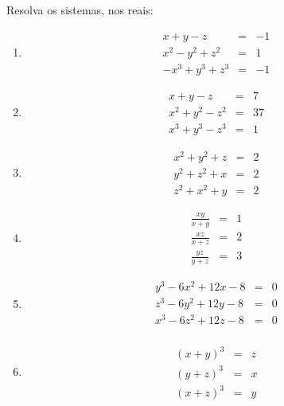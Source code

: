 \begin{questao}
  Resolva os sistemas, nos reais:

  \begin{enumerate}
    
  \item
    \begin{eqnarray*}
      x+y-z & = & -1 \\ x^2-y^2+z^2 & = & 1 \\ -x^3+y^3+z^3 & = & -1
    \end{eqnarray*}
    
  \item
    \begin{eqnarray*}
      x+y-z & = & 7 \\ x^2+y^2-z^2 & = & 37 \\ x^3+y^3-z^3 & = & 1
    \end{eqnarray*}
    
  \item
    \begin{eqnarray*}
      x^2+y^2+z & = & 2 \\ y^2+z^2+x & = & 2 \\ z^2+x^2+y & = & 2
    \end{eqnarray*}
    
  \item
    \begin{eqnarray*}
      \frac{xy}{x+y} & = & 1 \\ \frac{xz}{x+z} & = & 2 \\ \frac{yz}{y+z} & = & 3
    \end{eqnarray*}
    
  \item
    \begin{eqnarray*}
      y^3-6x^2+12x-8 & = & 0 \\ z^3-6y^2+12y-8 & = & 0 \\ x^3-6z^2+12z-8 & = & 0
      \\
    \end{eqnarray*}
    
  \item
    \begin{eqnarray*}
      (x+y)^3 & = & z \\ (y+z)^3 & = & x \\ (x+z)^3 & = & y
    \end{eqnarray*}
  \end{enumerate}

\end{questao}

